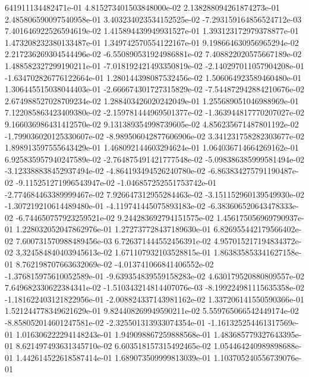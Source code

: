641911134482471e-01	4.815273401503848000e-02	2.138288094261874273e-01	2.485806590097540958e-01	3.403234023534152525e-02	-7.293159164856524712e-03	7.401646922526594619e-02	1.415894439949931527e-01	1.393123172979378877e-01	1.473208232380133487e-01	1.349742570554122167e-01	9.198664630956965294e-02	2.217236269304544496e-02	-6.550890531924986881e-02	7.408822020575667189e-02	1.488582327299190211e-01	-7.018192421493350819e-02	-2.140297011057904208e-01	-1.634702826776122664e-01	1.280144398087532456e-02	1.506064923589460480e-01	1.306445515038044403e-01	-2.666674301727315829e-02	-7.544872942884210676e-02	2.674988527028709234e-02	1.288403426020242049e-01	1.255689051046988969e-01	7.122085863423409380e-02	-2.159781444969501377e-02	-1.363944817770207027e-02	9.166036986431412570e-02	9.131389354998739605e-02	4.856235671487801192e-02	-1.799036020125330607e-02	-8.989506042877606906e-02	3.341231758282303677e-02	1.898913597555643429e-01	1.468092144603294624e-01	1.064036714664269162e-01	6.925835957940247589e-02	-2.764875491421777548e-02	-5.098386385999581494e-02	-3.123388838452937494e-02	-4.864193494526240780e-02	-6.863834275791190487e-02	-9.115251271996543947e-02	-1.046857252551753742e-01	-2.774684463389999467e-02	7.926647312955284463e-02	-3.151152960139549930e-02	-1.307219210614489480e-01	-4.119741445075893183e-02	-6.383606520643478333e-02	-6.744650757923259521e-02	9.244283692794151575e-02	1.456175056969790937e-01	1.228032052047862976e-01	1.272737728437189630e-01	6.826955442179566402e-02	7.600731570988489456e-03	6.726371444552456391e-02	4.957015217194834372e-02	3.324584840403945613e-02	1.671107932103528815e-01	1.863835853341627158e-01	8.762198707663632069e-02	-4.013741066841406552e-02	-1.376815975610052589e-01	-9.639354839559158283e-02	4.630179520880809557e-02	7.649682330622384341e-02	-1.510343214814407076e-03	-8.199224981115635358e-02	-1.181622403121822956e-01	-2.008824337143981162e-02	1.337206141550590366e-01	1.521244778349621629e-01	9.824408269949590211e-02	5.559765066542449174e-02	-8.858052014601247581e-02	-2.325501313933074354e-01	-1.161325254461317569e-01	1.016306222294148243e-01	1.949098867259888568e-01	1.483685779327643395e-01	8.621497493631345710e-02	6.603518157315492465e-02	1.054464240989898688e-01	1.442614522618587414e-01	1.689073509999813039e-01	1.103705240556739076e-01
